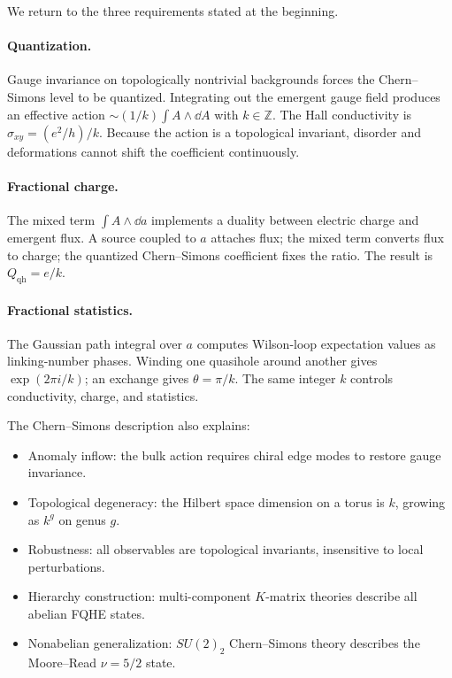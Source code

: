 We return to the three requirements stated at the beginning.

\paragraph{Quantization.} Gauge invariance on topologically nontrivial backgrounds forces the Chern--Simons level to be quantized. Integrating out the emergent gauge field produces an effective action $\sim (1/k)\int A\wedge\dd A$ with $k\in\mathbb{Z}$. The Hall conductivity is $\sigma_{xy}=(e^2/h)/k$. Because the action is a topological invariant, disorder and deformations cannot shift the coefficient continuously.

\paragraph{Fractional charge.} The mixed term $\int A\wedge\dd a$ implements a duality between electric charge and emergent flux. A source coupled to $a$ attaches flux; the mixed term converts flux to charge; the quantized Chern--Simons coefficient fixes the ratio. The result is $Q_{\mathrm{qh}}=e/k$.

\paragraph{Fractional statistics.} The Gaussian path integral over $a$ computes Wilson-loop expectation values as linking-number phases. Winding one quasihole around another gives $\exp(2\pi i/k)$; an exchange gives $\theta=\pi/k$. The same integer $k$ controls conductivity, charge, and statistics.

The Chern--Simons description also explains:
\begin{itemize}
  \item Anomaly inflow: the bulk action requires chiral edge modes to restore gauge invariance.
  \item Topological degeneracy: the Hilbert space dimension on a torus is $k$, growing as $k^g$ on genus $g$.
  \item Robustness: all observables are topological invariants, insensitive to local perturbations.
  \item Hierarchy construction: multi-component $K$-matrix theories describe all abelian FQHE states.
  \item Nonabelian generalization: $SU(2)_2$ Chern--Simons theory describes the Moore--Read $\nu=5/2$ state.
\end{itemize}

